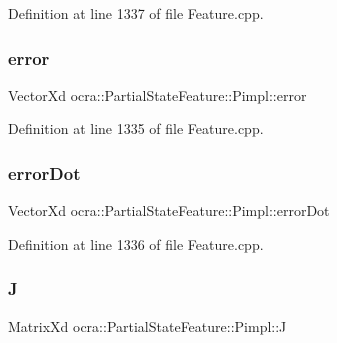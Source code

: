 Definition at line 1337 of file Feature.\+cpp.

\hypertarget{structocra_1_1PartialStateFeature_1_1Pimpl_a92618339173100da4f1759fca1c5de69}{}\label{structocra_1_1PartialStateFeature_1_1Pimpl_a92618339173100da4f1759fca1c5de69} 
\subsubsection{\texorpdfstring{error}{error}}
{\footnotesize\ttfamily Vector\+Xd ocra\+::\+Partial\+State\+Feature\+::\+Pimpl\+::error}



Definition at line 1335 of file Feature.\+cpp.

\hypertarget{structocra_1_1PartialStateFeature_1_1Pimpl_a761ba2024bc9792be9d3317ac0e7006e}{}\label{structocra_1_1PartialStateFeature_1_1Pimpl_a761ba2024bc9792be9d3317ac0e7006e} 
\subsubsection{\texorpdfstring{error\+Dot}{errorDot}}
{\footnotesize\ttfamily Vector\+Xd ocra\+::\+Partial\+State\+Feature\+::\+Pimpl\+::error\+Dot}



Definition at line 1336 of file Feature.\+cpp.

\hypertarget{structocra_1_1PartialStateFeature_1_1Pimpl_aa1bea74398a6c6774e4178c9a07585fc}{}\label{structocra_1_1PartialStateFeature_1_1Pimpl_aa1bea74398a6c6774e4178c9a07585fc} 
\subsubsection{\texorpdfstring{J}{J}}
{\footnotesize\ttfamily Matrix\+Xd ocra\+::\+Partial\+State\+Feature\+::\+Pimpl\+::J}



